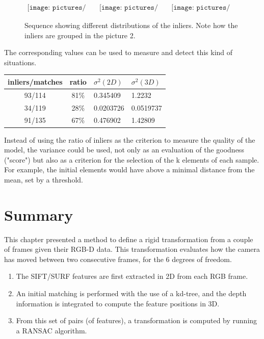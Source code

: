 \begin{figure}[H]
\centering$
 \begin{array}{ccc}
 \texttt{[image: pictures/bad\_transform1]} &
 \texttt{[image: pictures/bad\_transform2]} &
 \texttt{[image: pictures/bad\_transform3]}
 \end{array}$
\caption{Sequence showing different distributions of the inliers. Note how the inliers are grouped in the picture 2.}
\end{figure}

The corresponding values can be used to measure and detect this kind of situations.

\begin{tabular}{ccll}
 inliers/matches & ratio & $\sigma^2(2D)$ & $\sigma^2(3D)$\\
 \hline
 93/114 &	81\% &	0.345409 &	1.2232\\
 34/119 &	28\% &	0.0203726 &	0.0519737\\
 91/135 &	67\% &	0.476902 &	1.42809\\
\end{tabular}

Instead of using the ratio of inliers as the criterion to measure the quality of the model, the variance could be used, not only as an evaluation of the goodness ("score") but also as a criterion for the selection of the k elements of each sample. For example, the initial elements would have above a minimal distance from the mean, set by a threshold.

\section{Summary}

This chapter presented a method to define a rigid transformation from a couple of frames given their RGB-D data. This transformation evaluates how the camera has moved between two consecutive frames, for the 6 degrees of freedom.

\begin{enumerate}
\item The \gls{SIFT}/\gls{SURF} features are first extracted in 2D from each RGB frame.
\item An initial matching is performed with the use of a kd-tree, and the depth information is integrated to compute the feature positions in 3D.
\item From this set of pairs (of features), a transformation is computed by running a \gls{RANSAC} algorithm.
\end{enumerate}


